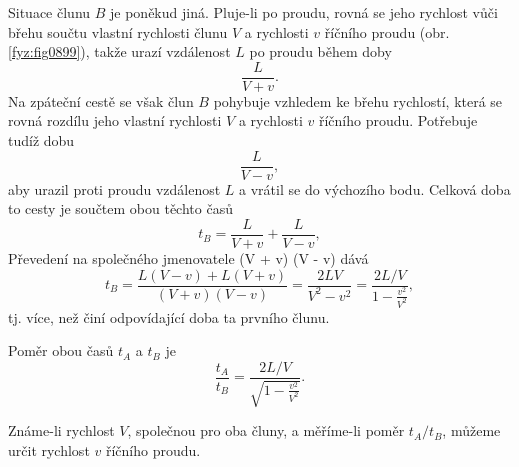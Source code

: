 \begin{fyzexam}
  Situace člunu \(B\) je poněkud jiná. Pluje-li po proudu, rovná se jeho rychlost vůči břehu součtu
  vlastní rychlosti člunu \(V\) a rychlosti \(v\) říčního proudu (obr. \ref{fyz:fig0899}), takže
  urazí vzdálenost \(L\) po proudu během doby
  \begin{equation*}
    \frac{L}{V+v}.
  \end{equation*}
  Na zpáteční cestě se však člun \(B\) pohybuje vzhledem ke břehu rychlostí, která se rovná rozdílu
  jeho vlastní rychlosti \(V\) a rychlosti \(v\) říčního proudu. Potřebuje tudíž dobu
  \begin{equation*}
    \frac{L}{V-v},
  \end{equation*}
  aby urazil proti proudu vzdálenost \(L\) a vrátil se do výchozího bodu. Celková doba to cesty je
  součtem obou těchto časů
  \begin{equation*}
    t_B = \frac{L}{V+v} + \frac{L}{V-v},
  \end{equation*}
  Převedení na společného jmenovatele (V + v) (V - v) dává 
  \begin{equation*}
    t_B = \frac{L(V-v)+L(V+v)}{(V+v)(V-v)} = \frac{2LV}{V^2 -v^2} 
        = \frac{2L/V}{1 - \frac{v^2}{V^2}},
  \end{equation*}
  tj. více, než činí odpovídající doba ta prvního člunu.

  {\centering
  \captionsetup{type=figure}
   \par}

  Poměr obou časů \(t_A\) a \(t_B\) je
  \begin{equation*}
    \frac{t_A}{t_B} = \frac{2L/V}{\sqrt{1 - \frac{v^2}{V^2}}}.
  \end{equation*}

  Známe-li rychlost \(V\), společnou pro oba čluny, a měříme-li poměr \(t_A/t_B\), můžeme určit
  rychlost \(v\) říčního proudu.
\end{fyzexam}